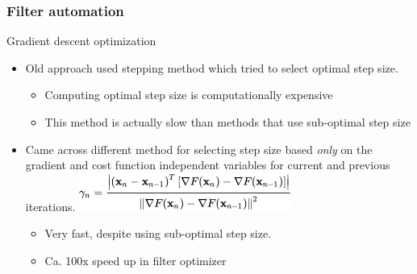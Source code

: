 \documentclass[t, screen, aspectratio=43]{beamer}
\begin{document}
\begin{frame}
	\frametitle{Filter automation}
	\begin{block}{Gradient descent optimization}
		\begin{itemize}
			\footnotesize
			\item Old approach used stepping method which tried to select optimal step size.
			\begin{itemize}
				\footnotesize
				\item Computing optimal step size is computationally expensive
				\item This method is actually slow than methods that use sub-optimal step size
			\end{itemize}
			\item Came across different method for selecting step size based \textit{only} on the gradient and cost function independent variables for current and previous iterations. 			
			\center
			\includegraphics[width=0.4\linewidth]{gradstep.png}
			\begin{itemize}
				\footnotesize
				\item Very fast, despite using sub-optimal step size.
				\item Ca. 100x speed up in filter optimizer
			\end{itemize}

		\end{itemize}    
	\end{block}
\end{frame}
\end{document}
